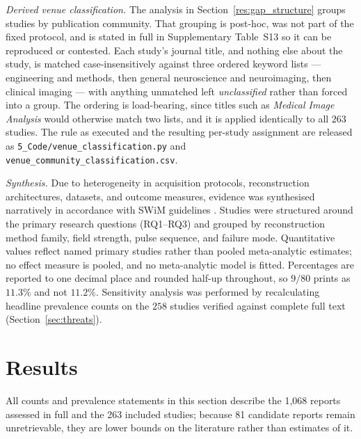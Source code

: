 \documentclass[review,authoryear]{elsarticle}
\begin{document}
\emph{Derived venue classification.} The analysis in
Section~\ref{res:gap_structure} groups studies by publication community. That grouping is
post-hoc, was not part of the fixed protocol, and is stated in full in Supplementary
Table~S13 so it can be reproduced or contested. Each study's journal title, and nothing
else about the study, is matched case-insensitively against three ordered keyword lists
--- engineering and methods, then general neuroscience and neuroimaging, then clinical
imaging --- with anything unmatched left \emph{unclassified} rather than forced into a
group. The ordering is load-bearing, since titles such as \emph{Medical Image Analysis}
would otherwise match two lists, and it is applied identically to all $263$ studies. The
rule as executed and the resulting per-study assignment are released as
\texttt{5\_Code/venue\_classification.py} and
\texttt{venue\_community\_classification.csv}.

\emph{Synthesis.} Due to heterogeneity in acquisition protocols, reconstruction
architectures, datasets, and outcome measures, evidence was synthesised narratively in
accordance with SWiM guidelines \citep{swim2020}. Studies were structured around the
primary research questions (RQ1--RQ3) and grouped by reconstruction method family, field
strength, pulse sequence, and failure mode. Quantitative values reflect named primary
studies rather than pooled meta-analytic estimates; no effect measure is pooled, and no
meta-analytic model is fitted. Percentages are reported to one decimal place and
rounded half-up throughout, so $9/80$ prints as $11.3\%$ and not $11.2\%$. Sensitivity
analysis was performed by recalculating headline prevalence counts on the $258$ studies
verified against complete full text (Section~\ref{sec:threats}).

\section{Results}
\label{sec:results}

All counts and prevalence statements in this section describe the 1{,}068 reports
assessed in full and the 263 included studies; because 81 candidate reports remain
unretrievable, they are lower bounds on the literature rather than estimates of
it.
\end{document}
